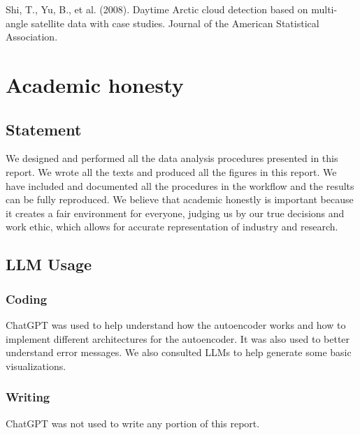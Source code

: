 \documentclass[11pt,letterpaper]{article}
\begin{document}
Shi, T., Yu, B., et al. (2008). Daytime Arctic cloud detection based on multi-angle satellite data with case studies. Journal of the American Statistical Association.
\appendix
\section{Academic honesty}
\subsection{Statement}
We designed and performed all the data analysis procedures presented in this report. We wrote all the texts and produced all the figures in this report. We have included and documented all the procedures in the workflow and the results can be fully reproduced. We believe that academic honestly is important because it creates a fair environment for everyone, judging us by our true decisions and work ethic, which allows for accurate
representation of industry and research.
\subsection{LLM Usage}


\subsubsection*{Coding}
ChatGPT was used to help understand how the autoencoder works and how to implement different architectures for the autoencoder. It was also used to better understand error messages. We also consulted LLMs to help generate some basic visualizations.
\subsubsection*{Writing}
ChatGPT was not used to write any portion of this report.
\end{document}
